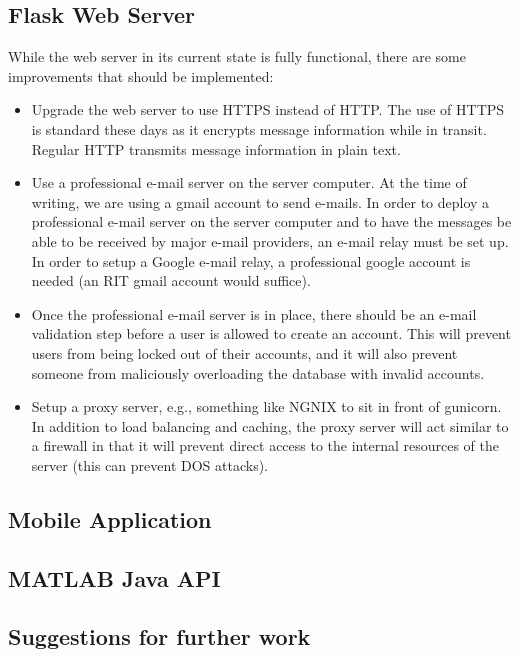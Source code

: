 \documentclass[conference]{IEEEtran}
\begin{document}
\subsection{Flask Web Server}

While the web server in its current state is fully functional, there are some improvements that should be implemented:

\begin{itemize}
    \item Upgrade the web server to use HTTPS instead of HTTP. The use of HTTPS is standard these days as it encrypts message information while in transit. Regular HTTP transmits message information in plain text.
    \item Use a professional e-mail server on the server computer. At the time of writing, we are using a gmail account to send e-mails. In order to deploy a professional e-mail server on the server computer and to have the messages be able to be received by major e-mail providers, an e-mail relay must be set up. In order to setup a Google e-mail relay, a professional google account is needed (an RIT gmail account would suffice).
    \item Once the professional e-mail server is in place, there should be an e-mail validation step before a user is allowed to create an account. This will prevent users from being locked out of their accounts, and it will also prevent someone from maliciously overloading the database with invalid accounts.
    \item Setup a proxy server, e.g., something like NGNIX to sit in front of gunicorn. In addition to load balancing and caching, the proxy server will act similar to a firewall in that it will prevent direct access to the internal resources of the server (this can prevent DOS attacks).
\end{itemize}

\subsection{Mobile Application}

\subsection{MATLAB Java API}

\subsection{Suggestions for further work}
\end{document}
